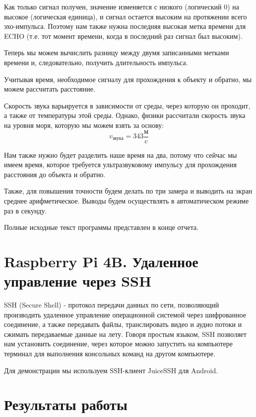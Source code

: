 \documentclass[a4paper, 14pt]{article}
\begin{document}
Как только сигнал получен, значение изменяется с низкого (логический 0) на высокое (логическая единица), и сигнал остается высоким на протяжении всего эхо-импульса. Поэтому нам также нужна последняя высокая метка времени для ECHO (т.е. тот момент времени, когда в последний раз сигнал был высоким).

Теперь мы можем вычислить разницу между двумя записанными метками времени и, следовательно, получить длительность импульса.

Учитывая время, необходимое сигналу для прохождения к объекту и обратно, мы можем рассчитать расстояние.

Скорость звука варьируется в зависимости от среды, через которую он проходит, а также от температуры этой среды. Однако, физики рассчитали скорость звука на уровня моря, которую мы можем взять за основу:
$$v_{\text{звука}} = 343 \frac{\text{м}}{\text{c}}$$

Нам также нужно будет разделить наше время на два, потому что сейчас мы имеем время, которое требуется ультразвуковому импульсу для прохождения расстояния до объекта и обратно.

Также, для повышения точности будем делать по три замера и выводить на экран среднее арифметическое. Выводы будем осуществлять в автоматическом режиме раз в секунду.

Полные исходные текст программы представлен в конце отчета.

\newpage
\section{Raspberry Pi 4B. Удаленное управление через SSH}

SSH (Secure Shell) - протокол передачи данных по сети, позволяющий производить удаленное управление операционной системой через шифрованное соединение, а также передавать файлы, транслировать видео и аудио потоки и сжимать передаваемые данные на лету. Говоря простым языком, SSH позволяет нам установить соединение, через которое можно запустить на компьютере терминал для выполнения консольных команд на другом компьютере.

Для демонстрации мы используем SSH-клиент JuiceSSH для Android.

\newpage
\section{Результаты работы}
\end{document}
